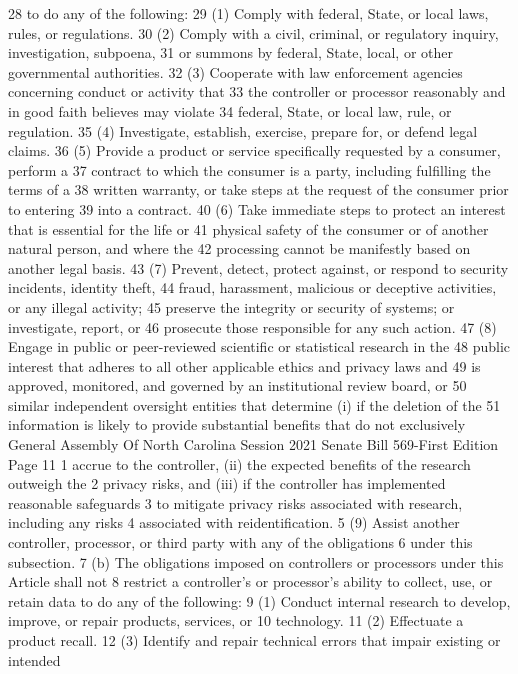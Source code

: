 28 to do any of the following:
29 (1) Comply with federal, State, or local laws, rules, or regulations.
30 (2) Comply with a civil, criminal, or regulatory inquiry, investigation, subpoena,
31 or summons by federal, State, local, or other governmental authorities.
32 (3) Cooperate with law enforcement agencies concerning conduct or activity that
33 the controller or processor reasonably and in good faith believes may violate
34 federal, State, or local law, rule, or regulation.
35 (4) Investigate, establish, exercise, prepare for, or defend legal claims.
36 (5) Provide a product or service specifically requested by a consumer, perform a
37 contract to which the consumer is a party, including fulfilling the terms of a
38 written warranty, or take steps at the request of the consumer prior to entering
39 into a contract.
40 (6) Take immediate steps to protect an interest that is essential for the life or
41 physical safety of the consumer or of another natural person, and where the
42 processing cannot be manifestly based on another legal basis.
43 (7) Prevent, detect, protect against, or respond to security incidents, identity theft,
44 fraud, harassment, malicious or deceptive activities, or any illegal activity;
45 preserve the integrity or security of systems; or investigate, report, or
46 prosecute those responsible for any such action.
47 (8) Engage in public or peer-reviewed scientific or statistical research in the
48 public interest that adheres to all other applicable ethics and privacy laws and
49 is approved, monitored, and governed by an institutional review board, or
50 similar independent oversight entities that determine (i) if the deletion of the
51 information is likely to provide substantial benefits that do not exclusively 
General Assembly Of North Carolina Session 2021
Senate Bill 569-First Edition Page 11
1 accrue to the controller, (ii) the expected benefits of the research outweigh the
2 privacy risks, and (iii) if the controller has implemented reasonable safeguards
3 to mitigate privacy risks associated with research, including any risks
4 associated with reidentification.
5 (9) Assist another controller, processor, or third party with any of the obligations
6 under this subsection.
7 (b) The obligations imposed on controllers or processors under this Article shall not
8 restrict a controller's or processor's ability to collect, use, or retain data to do any of the following:
9 (1) Conduct internal research to develop, improve, or repair products, services, or
10 technology.
11 (2) Effectuate a product recall.
12 (3) Identify and repair technical errors that impair existing or intended
